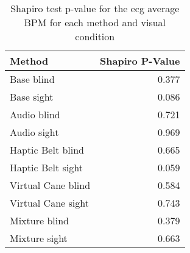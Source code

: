 
\begin{table}[!htb]
\centering
\caption{Shapiro test p-value for the ecg average BPM for each method and visual condition}
\label{tab:shapiro_ecg_bpm}
\begin{tabular}{lr}
\toprule
            Method &  Shapiro P-Value \\
\midrule
        Base blind &            0.377 \\
        Base sight &            0.086 \\
       Audio blind &            0.721 \\
       Audio sight &            0.969 \\
 Haptic Belt blind &            0.665 \\
 Haptic Belt sight &            0.059 \\
Virtual Cane blind &            0.584 \\
Virtual Cane sight &            0.743 \\
     Mixture blind &            0.379 \\
     Mixture sight &            0.663 \\
\bottomrule
\end{tabular}
\end{table}

